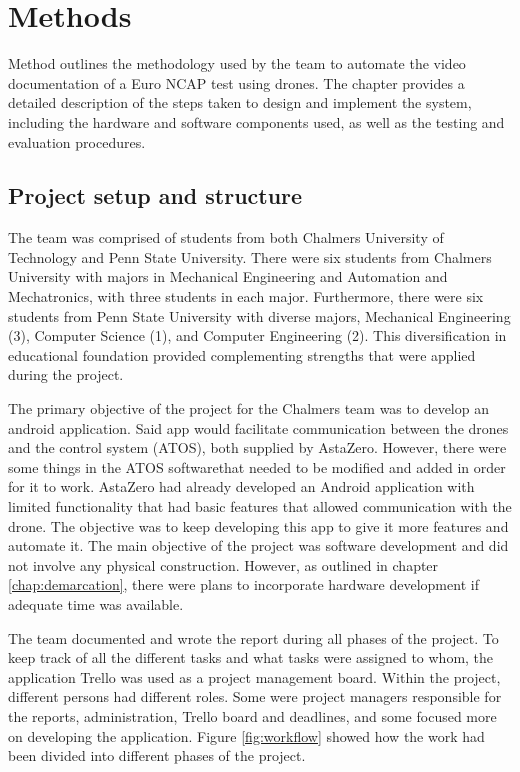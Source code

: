 
\chapter{Methods} 
Method outlines the methodology used by the team to automate the video documentation of a Euro NCAP test using drones. The chapter provides a detailed description of the steps taken to design and implement the system, including the hardware and software components used, as well as the testing and evaluation procedures.

\section{Project setup and structure}
The team was comprised of students from both Chalmers University of Technology
and Penn State University. There were six students from Chalmers University with
majors in Mechanical Engineering and Automation and Mechatronics, with three
students in each major. Furthermore, there were six students from Penn State University with diverse majors, Mechanical Engineering (3), Computer Science (1), and Computer Engineering (2). This diversification in educational foundation provided complementing strengths that were applied during the project.

The primary objective of the project for the Chalmers team was to develop an android application. Said app would facilitate communication between the drones and the control system (ATOS), both supplied by AstaZero. However, there were some things in the ATOS softwarethat  needed to be modified and added in order for it to work. AstaZero had already developed an Android application with limited functionality that had basic features that allowed communication with the drone. The objective was to keep developing this app to give it more features and automate it. The main objective of the project was software development and did not involve any physical construction. However, as outlined in chapter \ref{chap:demarcation}, there were plans to incorporate hardware development if adequate time was available.

The team documented and wrote the report during all phases of the project. To keep track of all the different tasks and what tasks were assigned to whom, the application Trello was used as a project management board. Within the project, different persons had different roles. Some were project managers responsible for the reports, administration, Trello board and deadlines, and some focused more on developing the application. Figure \ref{fig:workflow} showed how the work had been divided into different phases of the project.

